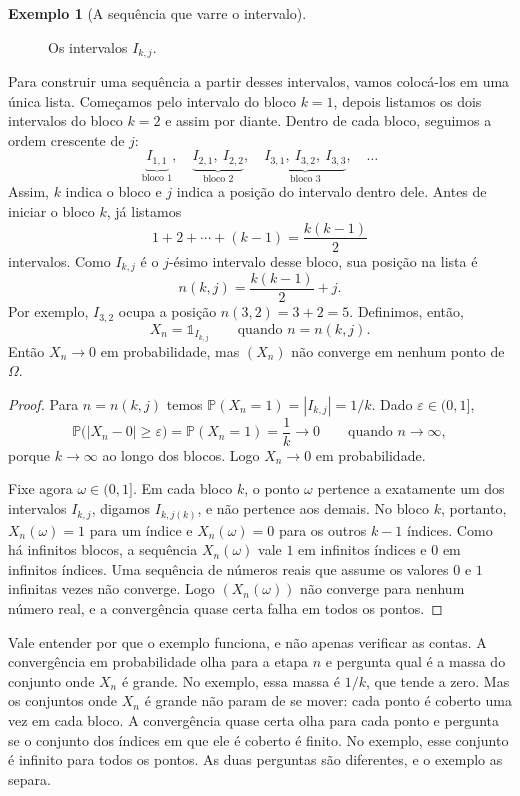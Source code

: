 \documentclass[12pt,portuguese]{article}
\theoremstyle{definition}
\newtheorem{example}[example]{Exemplo}
\theoremstyle{plainexercise}
\theoremstyle{starredexercise}
\theoremstyle{definition}
\begin{document}
\begin{example}[A sequência que varre o intervalo]
\begin{figure}[!htbp]
\caption{Os intervalos $I_{k,j}$.}
\label{fig:intervalos-typewriter}
\end{figure}

Para construir uma sequência a partir desses intervalos, vamos colocá-los em
uma única lista. Começamos pelo intervalo do bloco $k=1$, depois listamos os
dois intervalos do bloco $k=2$ e assim por diante. Dentro de cada bloco,
seguimos a ordem crescente de $j$:
\[
\underbrace{I_{1,1}}_{\text{bloco }1},\quad
\underbrace{I_{2,1},\ I_{2,2}}_{\text{bloco }2},\quad
\underbrace{I_{3,1},\ I_{3,2},\ I_{3,3}}_{\text{bloco }3},\quad
\ldots
\]
Assim, $k$ indica o bloco e $j$ indica a posição do intervalo dentro dele.
Antes de iniciar o bloco $k$, já listamos
\[
1+2+\cdots+(k-1)=\frac{k(k-1)}{2}
\]
intervalos. Como $I_{k,j}$ é o $j$-ésimo intervalo desse bloco, sua posição na
lista é
\[
n(k,j)=\frac{k(k-1)}{2}+j.
\]
Por exemplo, $I_{3,2}$ ocupa a posição $n(3,2)=3+2=5$.
Definimos, então,
\[
X_n=\mathds{1}_{I_{k,j}}
\qquad\text{quando } n=n(k,j).
\]
Então $X_n\to0$ em probabilidade, mas $(X_n)$ não converge em nenhum ponto de
$\Omega$.
\end{example}

\begin{proof}
Para $n=n(k,j)$ temos $\mathbb{P}(X_n=1)=|I_{k,j}|=1/k$. Dado
$\varepsilon\in(0,1]$,
\[
\mathbb{P}\bigl(|X_n-0|\geqslant\varepsilon\bigr)
=
\mathbb{P}(X_n=1)=\frac{1}{k}\longrightarrow0
\qquad\text{quando } n\to\infty,
\]
porque $k\to\infty$ ao longo dos blocos. Logo $X_n\to0$ em probabilidade.

Fixe agora $\omega\in(0,1]$. Em cada bloco $k$, o ponto $\omega$ pertence a
exatamente um dos intervalos $I_{k,j}$, digamos $I_{k,j(k)}$, e não pertence aos
demais. No bloco $k$, portanto, $X_n(\omega)=1$ para um índice e
$X_n(\omega)=0$ para os outros $k-1$ índices. Como há infinitos blocos, a
sequência $X_n(\omega)$ vale $1$ em infinitos índices e $0$ em infinitos
índices. Uma sequência de números reais que assume os valores $0$ e $1$
infinitas vezes não converge. Logo $(X_n(\omega))$ não converge para nenhum
número real, e a convergência quase certa falha em todos os pontos.
\end{proof}

Vale entender por que o exemplo funciona, e não apenas verificar as contas. A
convergência em probabilidade olha para a etapa $n$ e pergunta qual é a massa
do conjunto onde $X_n$ é grande. No exemplo, essa massa é $1/k$, que tende a
zero. Mas os conjuntos onde $X_n$ é grande não param de se mover: cada ponto é
coberto uma vez em cada bloco. A convergência quase certa olha para cada ponto e
pergunta se o conjunto dos índices em que ele é coberto é finito. No exemplo,
esse conjunto é infinito para todos os pontos. As duas perguntas são diferentes,
e o exemplo as separa.
\end{document}
